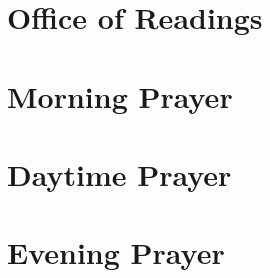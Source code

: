 \section*{Office of Readings}

\section*{Morning Prayer}

\section*{Daytime Prayer}

\section*{Evening Prayer}